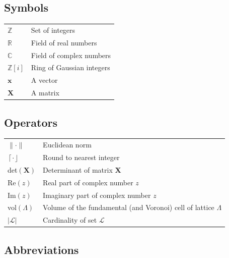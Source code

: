 \documentclass[english,12pt,a4paper,pdftex,sci,utf8]{aaltothesis}
\begin{document}
\newpage







\thesistableofcontents



\subsection*{Symbols}

\begin{tabular}{ll}
$\mathbb{Z}$  & Set of integers \\
$\mathbb{R}$  & Field of real numbers \\
$\mathbb{C}$  & Field of complex numbers \\
$\mathbb{Z}[i]$ & Ring of Gaussian integers \\
$\mathbf{x}$  & A vector \\
$\mathbf{X}$  & A matrix \\
\end{tabular}

\subsection*{Operators}

\begin{tabular}{ll}
$\| \cdot \| $     & Euclidean norm \\
$\left\lceil\cdot\right\rfloor$ & Round to nearest integer \\
det$(\mathbf{X})$  & Determinant of matrix $\mathbf{X}$ \\
Re$(z)$ & Real part of complex number $z$ \\
Im$(z)$ & Imaginary part of complex number $z$ \\
vol$(\Lambda)$ & Volume of the fundamental (and Voronoi) cell of lattice $\Lambda$ \\
$|\mathcal{L}|$ & Cardinality of set $\mathcal{L}$ \\
\end{tabular}

\subsection*{Abbreviations}
\end{document}
